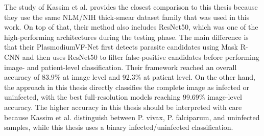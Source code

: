 \begin{table}[htbp]
\centering
\caption{Comparison with selected previous studies.}
\label{tab:benchmark}
\normalsize
{}
\end{table}

\FloatBarrier

The study of Kassim et al. \cite{Kassim2021} provides the closest comparison to this thesis because they use the same NLM/NIH thick-smear dataset family that was used in this work. On top of that, their method also includes ResNet50, which was one of the high-performing architectures during the testing phase. The main difference is that their PlasmodiumVF-Net first detects parasite candidates using Mask R-CNN and then uses ResNet50 to filter false-positive candidates before performing image- and patient-level classification. Their framework reached an overall accuracy of 83.9\% at image level and 92.3\% at patient level. On the other hand, the approach in this thesis directly classifies the complete image as infected or uninfected, with the best full-resolution models reaching 99.69\% image-level accuracy. The higher accuracy in this thesis should be interpreted with care because Kassim et al. distinguish between P. vivax, P. falciparum, and uninfected samples, while this thesis uses a binary infected/uninfected classification.

